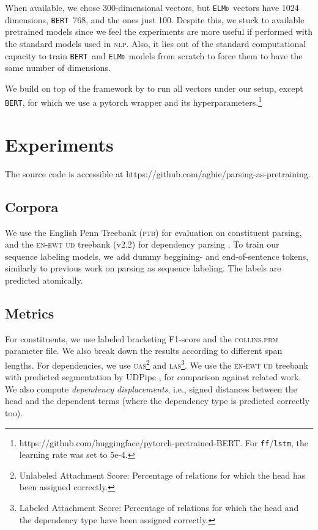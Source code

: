 \documentclass[letterpaper]{article} %
\newcommand{\citet}[1]{\citeauthor{#1} \shortcite{#1}}
\newcommand{\elmo}{\texttt{\textsc{ELMo}}}
\newcommand{\bert}{\texttt{\textsc{BERT}}}
\begin{document}
When available, we chose 300-dimensional vectors, but \elmo\ vectors have 1024 dimensions, \bert\ 768, and the \citet{ling2015two} ones just 100. Despite  this, we stuck to available pretrained models since we feel the experiments are more useful if performed with the standard models used in \textsc{nlp}. Also, it lies out of the standard computational capacity to train \bert\ and \elmo\ models from scratch to force them to have the same number of dimensions.

We build on top of the framework by \citet{yang2018ncrf++} to run all vectors under our setup, except \bert, for which we use a pytorch wrapper and its hyperparameters.\footnote{https://github.com/huggingface/pytorch-pretrained-BERT. For \texttt{ff}/\texttt{lstm}, the learning rate was set to 5e-4.}


\section{Experiments}

The source code is accessible at https://github.com/aghie/parsing-as-pretraining. 

\subsection{Corpora} We use the English Penn Treebank (\textsc{ptb}) \cite{marcus1993building} for evaluation on constituent parsing, and the \textsc{en-ewt} \textsc{ud} treebank (v2.2) for dependency parsing   \cite{UD2.1}. To train our sequence labeling models, we add dummy beggining- and end-of-sentence tokens, similarly to previous work on parsing as sequence labeling. The labels are predicted atomically. 

\subsection{Metrics} For constituents, we use labeled bracketing F1-score and the \textsc{collins.prm} parameter file. We also break down the results according to different span lengths. For dependencies, we use \textsc{uas}\footnote{Unlabeled Attachment Score: Percentage of relations for which the head has been assigned correctly.} and \textsc{las}\footnote{Labeled Attachment Score: Percentage of relations for which the head and the dependency type have been assigned correctly.}.
We use the \textsc{en-ewt ud} treebank with predicted segmentation by UDPipe \cite{straka:2018:K18-2}, for comparison against related work. We also compute \emph{dependency displacements}, i.e., signed distances between the head and the dependent terms (where the dependency type is predicted correctly too). 
\end{document}
